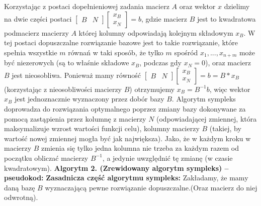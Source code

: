 \documentclass[licencjacka]{pracamgr}
\begin{document}
Korzystając z postaci dopełnieniowej zadania macierz $A$ oraz wektor $x$ dzielimy na dwie części postaci 
$\left[\begin{array}{cc}B&N\end{array}\right]\left[\begin{array}{c}x_B\\x_N\end{array}\right]=b$,
gdzie macierz $B$ jest to kwadratowa podmacierz macierzy $A$ której kolumny odpowiadają kolejnym składowym $x_B$.
W tej postaci dopuszczalne rozwiązanie bazowe jest to takie rozwiązanie, które spełnia wszystkie $m$ równań w taki sposób, że tylko $m$ spośród $x_1,...,x_{n+m}$ może być niezerowych
(są to właśnie składowe $x_B$, podczas gdy $x_N=0$), oraz macierz $B$ jest nieosobliwa.
Ponieważ mamy równość $\left[\begin{array}{cc}B&N\end{array}\right]\left[\begin{array}{c}x_B\\x_N\end{array}\right]=b=B*x_B$ (korzystając z nieosobliwości macierzy $B$) otrzymujemy 
$x_B=B^{-1}b$, więc wektor $x_B$ jest jednoznacznie wyznaczony przez dobór bazy $B$. Algorytm sympleks doprowadza do rozwiązania optymalnego poprzez zmiany bazy dokonywane za pomocą
zastąpienia przez kolumnę z macierzy $N$ (odpowiadającej zmiennej, która maksymalizuje wzrost wartości funkcji celu),
kolumny macierzy $B$ (takiej, by wartość nowej zmiennej mogła być jak największa).
Jako, że w każdym kroku w macierzy $B$ zmienia się tylko jedna kolumna nie trzeba za każdym razem od początku obliczać macierzy $B^{-1}$, a jedynie uwzględnić tę zmianę 
(w czasie kwadratowym).\newline\newline
%
\textbf{Algorytm 2. (Zrewidowany algorytm sympleks) -- pseudokod:}\newline\newline
%
\textbf{Zasadnicza część algorytmu sympleks:}\newline\newline
Zakładamy, że mamy daną bazę $B$ wyznaczającą pewne rozwiązanie dopuszczalne.(Oraz macierz do niej odwrotną).
\end{document}
